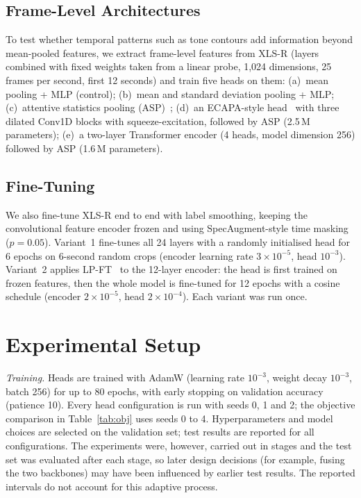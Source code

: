 \documentclass[conference]{IEEEtran}
\begin{document}
\subsection{Frame-Level Architectures}
\label{sec:frame}
To test whether temporal patterns such as tone contours add information beyond mean-pooled features, we extract frame-level features from XLS-R (layers combined with fixed weights taken from a linear probe, 1,024 dimensions, 25 frames per second, first 12 seconds) and train five heads on them: (a)~mean pooling + MLP (control); (b)~mean and standard deviation pooling + MLP; (c)~attentive statistics pooling (ASP)~\cite{asp}; (d)~an ECAPA-style head~\cite{ecapa} with three dilated Conv1D blocks with squeeze-excitation, followed by ASP (2.5\,M parameters); (e)~a two-layer Transformer encoder (4 heads, model dimension 256) followed by ASP (1.6\,M parameters).

\subsection{Fine-Tuning}
We also fine-tune XLS-R end to end with label smoothing, keeping the convolutional feature encoder frozen and using SpecAugment-style time masking~\cite{specaugment} ($p = 0.05$). Variant~1 fine-tunes all 24 layers with a randomly initialised head for 6 epochs on 6-second random crops (encoder learning rate $3\times10^{-5}$, head $10^{-3}$). Variant~2 applies LP-FT~\cite{lpft} to the 12-layer encoder: the head is first trained on frozen features, then the whole model is fine-tuned for 12 epochs with a cosine schedule (encoder $2\times10^{-5}$, head $2\times10^{-4}$). Each variant was run once.

\section{Experimental Setup}
\textit{Training.} Heads are trained with AdamW (learning rate $10^{-3}$, weight decay $10^{-3}$, batch 256) for up to 80 epochs, with early stopping on validation accuracy (patience 10). Every head configuration is run with seeds 0, 1 and 2; the objective comparison in Table~\ref{tab:obj} uses seeds 0 to 4. Hyperparameters and model choices are selected on the validation set; test results are reported for all configurations. The experiments were, however, carried out in stages and the test set was evaluated after each stage, so later design decisions (for example, fusing the two backbones) may have been influenced by earlier test results. The reported intervals do not account for this adaptive process.
\end{document}
